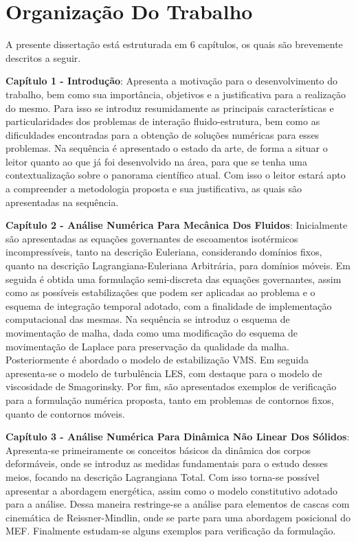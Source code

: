\section{Organização Do Trabalho}

A presente dissertação está estruturada em 6 capítulos, os quais são brevemente descritos a seguir.

    {
        \newcommand{\Capi}[2]{\textbf{Capítulo #1 - #2}:}

        \Capi{1}{Introdução} Apresenta a motivação para o desenvolvimento do trabalho, bem como sua importância, objetivos e a justificativa para a realização do mesmo. Para isso se introduz resumidamente as principais características e particularidades dos problemas de interação fluido-estrutura, bem como as dificuldades encontradas para a obtenção de soluções numéricas para esses problemas. Na sequência é apresentado o estado da arte, de forma a situar o leitor quanto ao que já foi desenvolvido na área, para que se tenha uma contextualização sobre o panorama científico atual. Com isso o leitor estará apto a compreender a metodologia proposta e sua justificativa, as quais são apresentadas na sequência.

        \Capi{2}{Análise Numérica Para Mecânica Dos Fluidos} Inicialmente são apresentadas as equações governantes de escoamentos isotérmicos incompressíveis, tanto na descrição Euleriana, considerando domínios fixos, quanto na descrição Lagrangiana-Euleriana Arbitrária, para domínios móveis. Em seguida é obtida uma formulação semi-discreta das equações governantes, assim como as possíveis estabilizações que podem ser aplicadas ao problema e o esquema de integração temporal adotado, com a finalidade de implementação computacional das mesmas. Na sequência se introduz o esquema de movimentação de malha, dada como uma modificação do esquema de movimentação de Laplace para preservação da qualidade da malha. Posteriormente é abordado o modelo de estabilização VMS. Em seguida apresenta-se o modelo de turbulência LES, com destaque para o modelo de viscosidade de Smagorinsky. Por fim, são apresentados exemplos de verificação para a formulação numérica proposta, tanto em problemas de contornos fixos, quanto de contornos móveis.

        \Capi{3}{Análise Numérica Para Dinâmica Não Linear Dos Sólidos} Apresenta-se primeiramente os conceitos básicos da dinâmica dos corpos deformáveis, onde se introduz as medidas fundamentais para o estudo desses meios, focando na descrição Lagrangiana Total. Com isso torna-se possível apresentar a abordagem energética, assim como o modelo constitutivo adotado para a análise. Dessa maneira restringe-se a análise para elementos de cascas com cinemática de Reissner-Mindlin, onde se parte para uma abordagem posicional do MEF. Finalmente estudam-se alguns exemplos para verificação da formulação.

}

